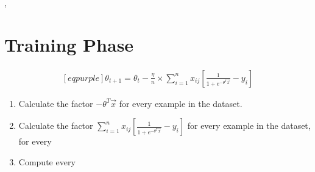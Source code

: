 \documentclass[
	number={4},
	title={Logistic Regression}
]{cs584notes}
\begin{document}
,  \data{$\theta = [b, w_{1}, w_{2}, w_{3}, w_{4}, w_{5}]$}

\section{Training Phase}\label{sec:training-phase}
\begin{equation*}
\begin{aligned}[eqpurple]
	\theta_{t+1} = \theta_{t} - \frac{\eta}{n}\times \sum_{i=1}^{n} x_{ij}\left[ \frac{1}{1 + e^{-\theta^{T}\vec{x}}} - y_{i} \right]
\end{aligned}
\end{equation*}

\begin{enumerate}[label=\arabic*)]
	\item Calculate the factor $-\theta^{T}\vec{x}$ for every example in the dataset.
	\item Calculate the factor $\sum_{i=1}^{n} x_{ij}\left[ \frac{1}{1 + e^{-\theta^{T}\vec{x}}} - y_{i} \right]$ for every example in the dataset, for every \data{$\theta$}
	\item Compute every \data{$\theta$}
\end{enumerate}


\end{document}
